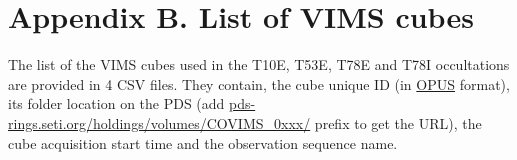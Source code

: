\documentclass{arxiv-icarus}
\begin{document}
\section*{Appendix B. List of VIMS cubes}

The list of the VIMS cubes used in the T10E, T53E, T78E and T78I occultations are provided in 4 CSV files.
They contain, the cube unique ID (in \href{https://tools.pds-rings.seti.org/opus/}{OPUS} format), its folder location on the PDS (add \href{https://pds-rings.seti.org/holdings/volumes/COVIMS_0xxx/}{pds-rings.seti.org/holdings/volumes/COVIMS\_0xxx/} prefix to get the URL), the cube acquisition start time and the observation sequence name.



\end{document}
